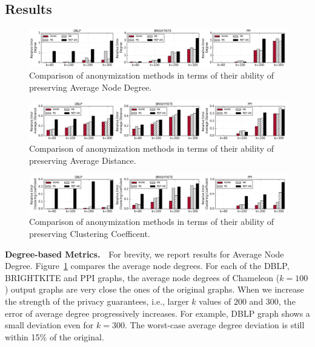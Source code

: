\subsection{Results}
\begin{figure}[!tb]
    \centering
    \includegraphics[width=\linewidth]{exp/ex_degree.eps}
    \caption{Comparison of anonymization methods in terms of their ability of preserving Average Node Degree.}
    \label{fig:ex_degree}
\end{figure}


\begin{figure}[!tb]
    \centering
    \includegraphics[width=\linewidth]{exp/ex_apd.eps}
    \caption{Comparison of anonymization methods in terms of their ability of preserving Average Distance.}
    \label{fig:ex_apd}
\end{figure}

\begin{figure}[!tb]
    \centering
    \includegraphics[width=\linewidth]{exp/ex_cc.eps}
    \caption{Comparison of anonymization methods in terms of their ability of preserving Clustering Coefficent.}
    \label{fig:ex_cc}
\end{figure}

\textbf{Degree-based Metrics.}~~For brevity, we report results for  Average Node Degree. 
Figure~\ref{fig:ex_degree} compares the average node degrees. For each of the DBLP, BRIGHTKITE and PPI graphs, the average node degrees of Chameleon ($k=100$) output graphs are very close the ones of the original graphs. When we increase the strength of the privacy guarantees, i.e., larger $k$ values of $200$ and $300$, the error of average degree progressively increases. For example, DBLP graph shows a small deviation even for $k=300$. The worst-case average degree deviation is still within 15\% of the original. 

